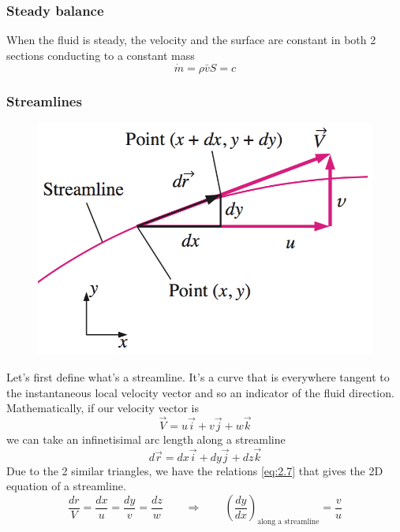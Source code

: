 		\subsubsection{Steady balance}
			When the fluid is steady, the velocity and the surface are constant in both 2 sections conducting to a constant mass
			\begin{equation}
				\dot{m} = \rho \bar{v}S = c
				\label{eq:2.4}
			\end{equation}

		\subsubsection{Streamlines}
			\begin{figure}
			\vspace{-5mm}
			\includegraphics[scale=0.35]{ch2/2}
			\end{figure}
			Let's first define what's a streamline. It's a curve that is everywhere tangent to the instantaneous local velocity vector and so an indicator of the fluid direction. 
			Mathematically, if our velocity vector is 
			\begin{equation}
				\vec{V} = u\vec{i}+v\vec{j}+w\vec{k}
			\end{equation}
			we can take an infinetisimal arc length along a streamline 
			\begin{equation}
				d\vec{r} = dx\vec{i}+dy\vec{j}+dz\vec{k}
			\end{equation}
			Due to the 2 similar triangles, we have the relations \autoref{eq:2.7} that gives the 2D equation of a streamline.
			\begin{equation}
				\frac{dr}{V} = \frac{dx}{u} = \frac{dy}{v} = \frac{dz}{w} \qquad
				 \Rightarrow \qquad
				 \left(\frac{dy}{dx}\right)_{\mbox{along a streamline}} = \frac{v}{u}
				\label{eq:2.7}
			\end{equation}
			
